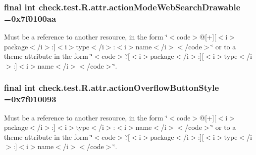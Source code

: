 \subsubsection[{action\+Mode\+Web\+Search\+Drawable}]{\setlength{\rightskip}{0pt plus 5cm}final int check.\+test.\+R.\+attr.\+action\+Mode\+Web\+Search\+Drawable =0x7f0100aa\hspace{0.3cm}{\ttfamily [static]}}\label{classcheck_1_1test_1_1_r_1_1attr_afa8798d214b16417489dd4868015a948}
Must be a reference to another resource, in the form \char`\"{}$<$code$>$@\mbox{[}+\mbox{]}\mbox{[}$<$i$>$package$<$/i$>$\+:\mbox{]}$<$i$>$type$<$/i$>$\+:$<$i$>$name$<$/i$>$$<$/code$>$\char`\"{} or to a theme attribute in the form \char`\"{}$<$code$>$?\mbox{[}$<$i$>$package$<$/i$>$\+:\mbox{]}\mbox{[}$<$i$>$type$<$/i$>$\+:\mbox{]}$<$i$>$name$<$/i$>$$<$/code$>$\char`\"{}. \hypertarget{classcheck_1_1test_1_1_r_1_1attr_a79f86eddf8f5ddb696413fb8240e9978}{}
\subsubsection[{action\+Overflow\+Button\+Style}]{\setlength{\rightskip}{0pt plus 5cm}final int check.\+test.\+R.\+attr.\+action\+Overflow\+Button\+Style =0x7f010093\hspace{0.3cm}{\ttfamily [static]}}\label{classcheck_1_1test_1_1_r_1_1attr_a79f86eddf8f5ddb696413fb8240e9978}
Must be a reference to another resource, in the form \char`\"{}$<$code$>$@\mbox{[}+\mbox{]}\mbox{[}$<$i$>$package$<$/i$>$\+:\mbox{]}$<$i$>$type$<$/i$>$\+:$<$i$>$name$<$/i$>$$<$/code$>$\char`\"{} or to a theme attribute in the form \char`\"{}$<$code$>$?\mbox{[}$<$i$>$package$<$/i$>$\+:\mbox{]}\mbox{[}$<$i$>$type$<$/i$>$\+:\mbox{]}$<$i$>$name$<$/i$>$$<$/code$>$\char`\"{}. \hypertarget{classcheck_1_1test_1_1_r_1_1attr_adf07fdf83e0f7e3666ca3c62d9051738}{}
